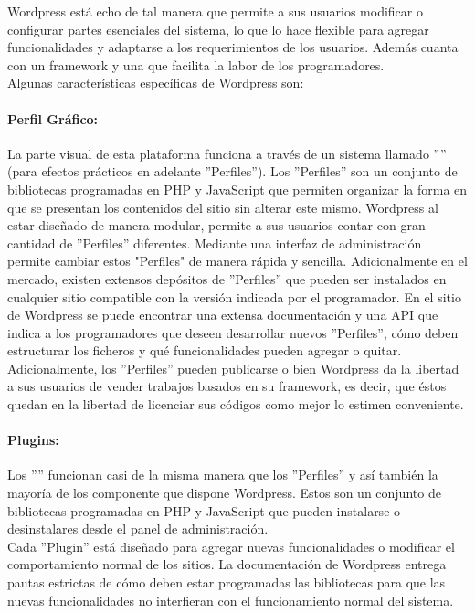 Wordpress está echo de tal manera que permite a sus usuarios modificar o configurar partes esenciales del sistema, lo que lo hace flexible para agregar funcionalidades y adaptarse a los requerimientos de los usuarios. Además cuanta con un framework y una  que facilita la labor de los programadores.\\

\newpage
Algunas características específicas de Wordpress son:

\paragraph{Perfil Gráfico:}	
La parte visual de esta plataforma funciona a través de un sistema llamado '''' (para efectos prácticos en adelante ''Perfiles''). Los ''Perfiles'' son un conjunto de bibliotecas programadas en PHP y JavaScript que permiten organizar la forma en que se presentan los contenidos del sitio sin alterar este mismo. Wordpress al estar diseñado de manera modular, permite a sus usuarios contar con gran cantidad de ''Perfiles'' diferentes. Mediante una interfaz de administración permite cambiar estos "Perfiles" de manera rápida y sencilla. Adicionalmente en el mercado, existen extensos depósitos de ''Perfiles'' que pueden ser instalados en cualquier sitio compatible con la versión indicada por el programador.
En el sitio de Wordpress se puede encontrar una extensa documentación y una API que indica a los programadores que deseen desarrollar nuevos ''Perfiles'', cómo deben estructurar los ficheros y qué funcionalidades pueden agregar o quitar. Adicionalmente, los ''Perfiles'' pueden publicarse o bien Wordpress da la libertad a sus usuarios de vender trabajos basados en su framework, es decir, que éstos quedan en la libertad de licenciar sus códigos como mejor lo estimen conveniente.

\paragraph{Plugins:}
Los ''''  funcionan casi de la misma manera que los ''Perfiles'' y así también la mayoría de los componente que dispone Wordpress. Estos son un conjunto de bibliotecas programadas en PHP y JavaScript que pueden instalarse o desinstalares desde el panel de administración.\\
Cada ''Plugin'' está diseñado para agregar nuevas funcionalidades o modificar el comportamiento normal de los sitios. La documentación de Wordpress entrega pautas estrictas de cómo deben estar programadas las bibliotecas para que las nuevas funcionalidades no interfieran con el funcionamiento normal del sistema.


